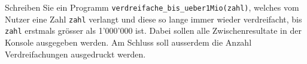



\begin{myexercise}
	Schreiben Sie ein Programm \lstinline|verdreifache_bis_ueber1Mio(zahl)|, welches vom Nutzer eine Zahl \texttt{zahl} verlangt und diese so lange immer wieder verdreifacht, bis \texttt{zahl} erstmals grösser als 1'000'000 ist. Dabei sollen alle Zwischenresultate in der Konsole ausgegeben werden. Am Schluss soll ausserdem die Anzahl Verdreifachungen ausgedruckt werden.
	\begin{myanswer}
		
	\end{myanswer}
\end{myexercise}

